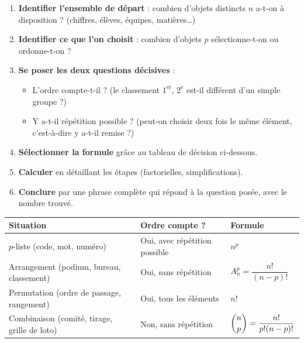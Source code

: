 \documentclass[11pt]{article}
\newcommand{\cle}[1]{{\popxbold\color{popdark}#1}}
\begin{document}
\begin{methode}
\begin{enumerate}
\item \textbf{Identifier l'ensemble de départ} : combien d'objets distincts $n$ a-t-on à disposition ? (chiffres, élèves, équipes, matières\ldots)
\item \textbf{Identifier ce que l'on choisit} : combien d'objets $p$ sélectionne-t-on ou ordonne-t-on ?
\item \textbf{Se poser les deux questions décisives} :
\begin{itemize}
\item L'\cle{ordre} compte-t-il ? (le classement $1^{\text{er}}$, $2^{\text{e}}$ est-il différent d'un simple groupe ?)
\item Y a-t-il \cle{répétition} possible ? (peut-on choisir deux fois le même élément, c'est-à-dire y a-t-il remise ?)
\end{itemize}
\item \textbf{Sélectionner la formule} grâce au tableau de décision ci-dessous.
\item \textbf{Calculer} en détaillant les étapes (factorielles, simplifications).
\item \textbf{Conclure} par une phrase complète qui répond à la question posée, avec le nombre trouvé.
\end{enumerate}
\end{methode}

\begin{aretenir}
\begin{center}
\begin{tabularx}{\linewidth}{|l|X|X|}
\hline
\rowcolor{popblueL} \textbf{Situation} & \textbf{Ordre compte ?} & \textbf{Formule} \\
\hline
$p$-liste (code, mot, numéro) & Oui, avec répétition possible & $n^p$ \\
\hline
Arrangement (podium, bureau, classement) & Oui, sans répétition & $A_n^p = \dfrac{n!}{(n-p)!}$ \\
\hline
Permutation (ordre de passage, rangement) & Oui, tous les éléments & $n!$ \\
\hline
Combinaison (comité, tirage, grille de loto) & Non, sans répétition & $\dbinom{n}{p} = \dfrac{n!}{p!(n-p)!}$ \\
\hline
\end{tabularx}
\end{center}
\end{aretenir}
\end{document}
